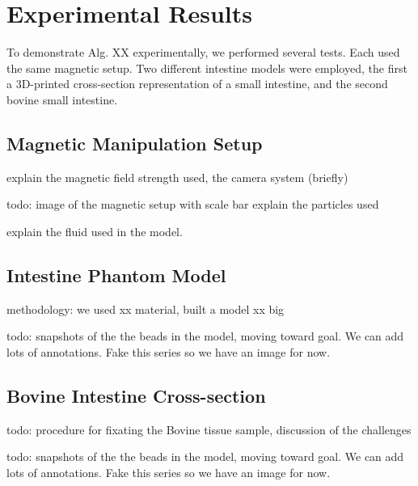 
\section{Experimental Results}\label{sec:expResults}

To demonstrate Alg. XX experimentally, we performed several tests.
Each used the same magnetic setup.
 Two different intestine models were employed, the first a 3D-printed cross-section representation of a small intestine, and the second bovine small intestine.
 
 \subsection{Magnetic Manipulation Setup}
 explain the magnetic field strength used, the camera system (briefly)

todo: image of the magnetic setup with scale bar
explain the particles used

explain the fluid used in the model.

\subsection{Intestine Phantom Model}

methodology: we used xx material, built a model xx big


todo: snapshots of the the beads in the model, moving toward goal.  We can add lots of annotations.  Fake this series so we have an image for now.


\subsection{Bovine Intestine Cross-section}
todo: procedure for fixating the Bovine tissue sample,
discussion of the challenges 

todo: snapshots of the the beads in the model, moving toward goal.  We can add lots of annotations.  Fake this series so we have an image for now.



